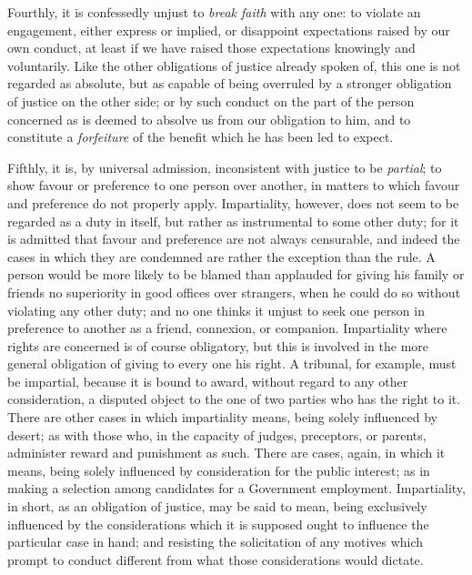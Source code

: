 \documentclass[12pt]{report}
\begin{document}
Fourthly, it is confessedly unjust to \emph{break faith} with any one: to violate an engagement, either express or implied, or disappoint expectations raised by our own conduct, at least if we have raised those expectations knowingly and voluntarily. Like the other obligations of justice already spoken of, this one is not regarded as absolute, but as capable of being overruled by a stronger obligation of justice on the other side; or by such conduct on the part of the person concerned as is deemed to absolve us from our obligation to him, and to constitute a \emph{forfeiture} of the benefit which he has been led to expect.

Fifthly, it is, by universal admission, inconsistent with justice to be \emph{partial}; to show favour or preference to one person over another, in matters to which favour and preference do not properly apply. Impartiality, however, does not seem to be regarded as a duty in itself, but rather as instrumental to some other duty; for it is admitted that favour and preference are not always censurable, and indeed the cases in which they are condemned are rather the exception than the rule. A person would be more likely to be blamed than applauded for giving his family or friends no superiority in good offices over strangers, when he could do so without violating any other duty; and no one thinks it unjust to seek one person in preference to another as a friend, connexion, or companion. Impartiality where rights are concerned is of course obligatory, but this is involved in the more general obligation of giving to every one his right. A tribunal, for example, must be impartial, because it is bound to award, without regard to any other consideration, a disputed object to the one of two parties who has the right to it. There are other cases in which impartiality means, being solely influenced by desert; as with those who, in the capacity of judges, preceptors, or parents, administer reward and punishment as such. There are cases, again, in which it means, being solely influenced by consideration for the public interest; as in making a selection among candidates for a Government employment. Impartiality, in short, as an obligation of justice, may be said to mean, being exclusively influenced by the considerations which it is supposed ought to influence the particular case in hand; and resisting the solicitation of any motives which prompt to conduct different from what those considerations would dictate.
\end{document}
